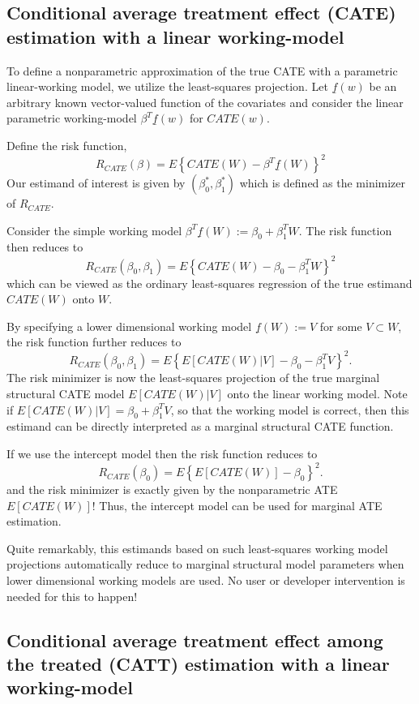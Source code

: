 \documentclass{article}
\begin{document}
\subsection{Conditional average treatment effect (CATE) estimation with a linear working-model}
To define a nonparametric approximation of the true CATE with a parametric linear-working model, we utilize the least-squares projection. Let $\underline{f}(w)$ be an arbitrary known vector-valued function of the covariates and consider the linear parametric working-model $\beta^T \underline{f}(w)$ for $CATE(w)$. 

Define the risk function,
$$R_{CATE}(\beta) = E \left\{CATE(W) - \beta^T \underline{f}(W)\right\}^2$$
Our estimand of interest is given by $(\beta_0^*, \beta_1^*)$ which is defined as the minimizer of $R_{CATE}$.

Consider the simple working model $\beta^T\underline{f}(W) := \beta_0 + \beta_1^T W$. The risk function then reduces to
$$R_{CATE}(\beta_0, \beta_1) = E \left\{CATE(W) - \beta_0 - \beta_1^T W\right\}^2$$
which can be viewed as the ordinary least-squares regression of the true estimand $CATE(W)$ onto $W$.

By specifying a lower dimensional working model $\underline{f}(W) := V$ for some $V \subset W$, the risk function further reduces to
$$R_{CATE}(\beta_0, \beta_1) = E \left\{E[CATE(W)|V] - \beta_0 - \beta_1^T V\right\}^2.$$
The risk minimizer is now the least-squares projection of the true marginal structural CATE model $E[CATE(W)|V]$ onto the linear working model. Note if $E[CATE(W)|V] =  \beta_0 + \beta_1^T V$, so that the working model is correct, then this estimand can be directly interpreted as a marginal structural CATE function.

If we use the intercept model then the risk function reduces to
$$R_{CATE}(\beta_0) = E \left\{E[CATE(W)] - \beta_0 \right\}^2.$$
and the risk minimizer is exactly given by the nonparametric ATE $E[CATE(W)]$! Thus, the intercept model can be used for marginal ATE estimation.

Quite remarkably, this estimands based on such least-squares working model projections automatically reduce to marginal structural model parameters when lower dimensional working models are used. No user or developer intervention is needed for this to happen!

\subsection{Conditional average treatment effect among the treated (CATT) estimation with a linear working-model}
\end{document}
